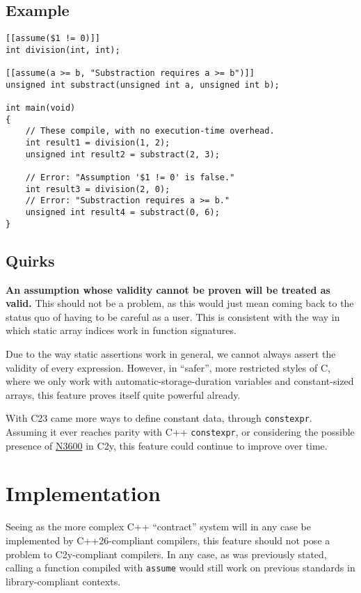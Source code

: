 \documentclass[a4paper, 12pt]{article}
\begin{document}
\subsection{Example}
\label{sec:org8ef7cc4}
\begin{verbatim}
[[assume($1 != 0)]]
int division(int, int);

[[assume(a >= b, "Substraction requires a >= b")]]
unsigned int substract(unsigned int a, unsigned int b);

int main(void)
{
    // These compile, with no execution-time overhead.
    int result1 = division(1, 2);
    unsigned int result2 = substract(2, 3);

    // Error: "Assumption '$1 != 0' is false."
    int result3 = division(2, 0);
    // Error: "Substraction requires a >= b."
    unsigned int result4 = substract(0, 6);
}
\end{verbatim}
\subsection{Quirks}
\label{sec:org6870099}
\textbf{An assumption whose validity cannot be proven will be treated as valid.}
This should not be a problem, as this would just mean coming back to the
status quo of having to be careful as a user.
This is consistent with the way in which static array indices work in
function signatures.

Due to the way static assertions work in general, we cannot always assert
the validity of every expression.  However, in ``safer'', more restricted
styles of C, where we only work with automatic-storage-duration variables
and constant-sized arrays, this feature proves itself quite powerful already.

With C23 came more ways to define constant data, through \texttt{constexpr}.  Assuming
it ever reaches parity with C++ \texttt{constexpr}, or considering the possible
presence of \href{https://open-std.org/jtc1/sc22/wg14/www/docs/n3600.htm}{N3600} in C2y, this feature could continue to improve over time.
\section{Implementation}
\label{sec:org7dd39ac}
Seeing as the more complex C++ ``contract'' system will in any case be implemented
by C++26-compliant compilers, this feature should not pose a problem to C2y-compliant
compilers. In any case, as was previously stated, calling a function compiled with
\texttt{assume} would still work on previous standards in library-compliant contexts.
\end{document}
